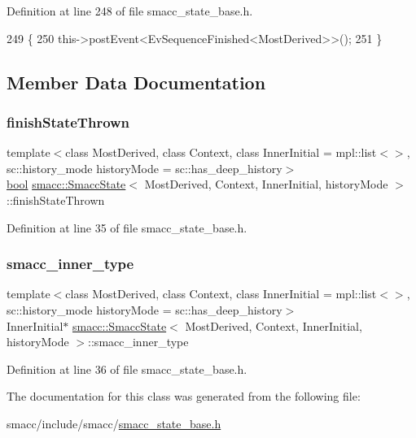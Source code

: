 Definition at line 248 of file smacc\+\_\+state\+\_\+base.\+h.


\begin{DoxyCode}
249     \{
250       this->postEvent<EvSequenceFinished<MostDerived>>();
251     \}
\end{DoxyCode}


\subsection{Member Data Documentation}
\mbox{\label{classsmacc_1_1SmaccState_a6c40f733c35ddfb9ae2a2f8e9bab07d3}} 
\subsubsection{\texorpdfstring{finish\+State\+Thrown}{finishStateThrown}}
{\footnotesize\ttfamily template$<$class Most\+Derived, class Context, class Inner\+Initial = mpl\+::list$<$$>$, sc\+::history\+\_\+mode history\+Mode = sc\+::has\+\_\+deep\+\_\+history$>$ \\
\hyperlink{classbool}{bool} \hyperlink{classsmacc_1_1SmaccState}{smacc\+::\+Smacc\+State}$<$ Most\+Derived, Context, Inner\+Initial, history\+Mode $>$\+::finish\+State\+Thrown}



Definition at line 35 of file smacc\+\_\+state\+\_\+base.\+h.

\mbox{\label{classsmacc_1_1SmaccState_a087d0f66729b98614feb8c59ea548af1}} 
\subsubsection{\texorpdfstring{smacc\+\_\+inner\+\_\+type}{smacc\_inner\_type}}
{\footnotesize\ttfamily template$<$class Most\+Derived, class Context, class Inner\+Initial = mpl\+::list$<$$>$, sc\+::history\+\_\+mode history\+Mode = sc\+::has\+\_\+deep\+\_\+history$>$ \\
Inner\+Initial$\ast$ \hyperlink{classsmacc_1_1SmaccState}{smacc\+::\+Smacc\+State}$<$ Most\+Derived, Context, Inner\+Initial, history\+Mode $>$\+::smacc\+\_\+inner\+\_\+type}



Definition at line 36 of file smacc\+\_\+state\+\_\+base.\+h.



The documentation for this class was generated from the following file\+:\begin{DoxyCompactItemize}
\item 
smacc/include/smacc/\hyperlink{smacc__state__base_8h}{smacc\+\_\+state\+\_\+base.\+h}\end{DoxyCompactItemize}
